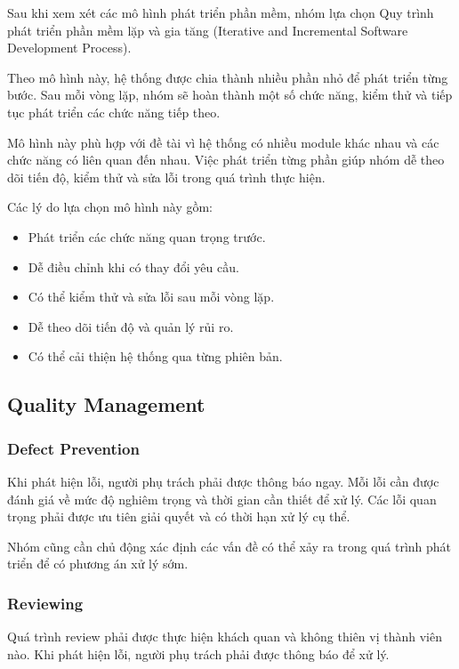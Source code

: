 Sau khi xem xét các mô hình phát triển phần mềm, nhóm lựa chọn Quy trình phát triển phần mềm lặp và gia tăng (Iterative and Incremental Software Development Process).

Theo mô hình này, hệ thống được chia thành nhiều phần nhỏ để phát triển từng bước. Sau mỗi vòng lặp, nhóm sẽ hoàn thành một số chức năng, kiểm thử và tiếp tục phát triển các chức năng tiếp theo.

Mô hình này phù hợp với đề tài vì hệ thống có nhiều module khác nhau và các chức năng có liên quan đến nhau. Việc phát triển từng phần giúp nhóm dễ theo dõi tiến độ, kiểm thử và sửa lỗi trong quá trình thực hiện.

Các lý do lựa chọn mô hình này gồm:

\begin{itemize}
	\item Phát triển các chức năng quan trọng trước.
	\item Dễ điều chỉnh khi có thay đổi yêu cầu.
	\item Có thể kiểm thử và sửa lỗi sau mỗi vòng lặp.
	\item Dễ theo dõi tiến độ và quản lý rủi ro.
	\item Có thể cải thiện hệ thống qua từng phiên bản.
\end{itemize}


\subsection{Quality Management}

\subsubsection{Defect Prevention}

Khi phát hiện lỗi, người phụ trách phải được thông báo ngay. Mỗi lỗi cần được đánh giá về mức độ nghiêm trọng và thời gian cần thiết để xử lý. Các lỗi quan trọng phải được ưu tiên giải quyết và có thời hạn xử lý cụ thể.

Nhóm cũng cần chủ động xác định các vấn đề có thể xảy ra trong quá trình phát triển để có phương án xử lý sớm.

\subsubsection{Reviewing}

Quá trình review phải được thực hiện khách quan và không thiên vị thành viên nào. Khi phát hiện lỗi, người phụ trách phải được thông báo để xử lý.

